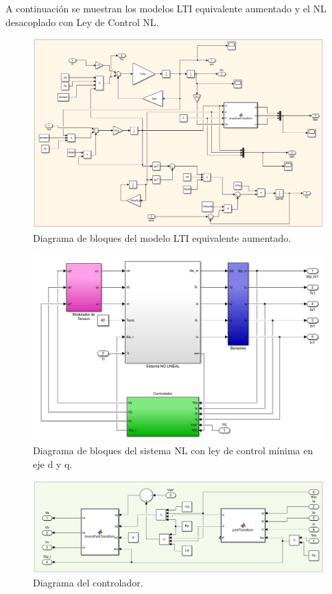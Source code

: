 \documentclass{article}
\begin{document}
\begin{enumerate}[label=\roman*.]

    A continuación se muestran los modelos LTI equivalente aumentado y el NL desacoplado con Ley de Control NL.

    \begin{figure}[H]
        \centering
        \includegraphics[width=1\textwidth]{LTI_aumentado1.png}
        \caption{Diagrama de bloques del modelo LTI equivalente aumentado.}
    \end{figure}

    \begin{figure}[H]
        \centering
        \includegraphics[width=1\textwidth]{LTI_AUMENTADO_Q.jpg}
        \caption{Diagrama de bloques del sistema NL con ley de control mínima en eje d y q.}
    \end{figure}

    \begin{figure}[H]
        \centering
        \includegraphics[width=1\textwidth]{LTI_AUMENTADO_Q_CONTROLADOR.jpg}
        \caption{Diagrama del controlador.}
    \end{figure}


\end{enumerate}
\end{document}
